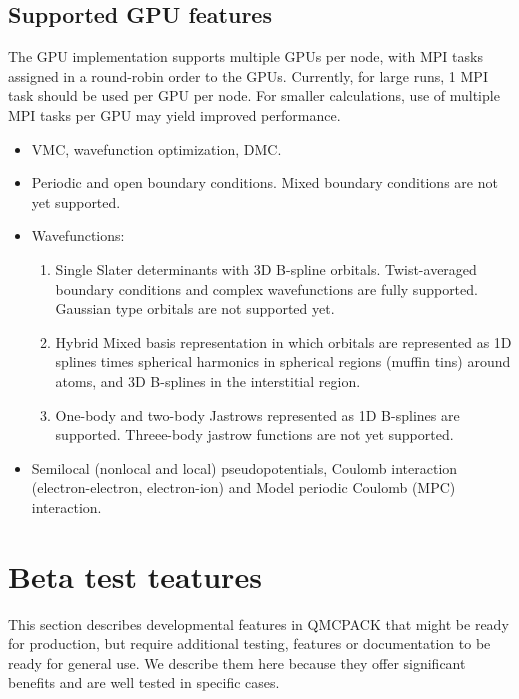 \subsection{Supported GPU features}

The GPU implementation supports multiple GPUs per node, with MPI tasks assigned
in a round-robin order to the GPUs. Currently, for large runs, 1 MPI task should
be used per GPU per node. For smaller calculations, use of multiple
MPI tasks per GPU may yield improved performance.

\begin{itemize}
  \item VMC, wavefunction optimization, DMC.
  \item Periodic and open boundary conditions. Mixed boundary conditions are not yet supported.
  \item Wavefunctions:
    \begin{enumerate}
        \item Single Slater determinants with 3D B-spline orbitals. Twist-averaged boundary conditions and complex wavefunctions are fully supported. Gaussian type orbitals are not supported yet.
        \item Hybrid Mixed basis representation in which orbitals are represented as 1D splines times spherical harmonics in spherical regions (muffin tins) around atoms, and 3D B-splines in the interstitial region.
        \item One-body and two-body Jastrows represented as 1D
          B-splines are supported. Threee-body jastrow functions are
          not yet supported.
    \end{enumerate}
  \item Semilocal (nonlocal and local) pseudopotentials, Coulomb interaction (electron-electron, electron-ion) and Model periodic Coulomb (MPC) interaction.
\end{itemize}

\section{Beta test teatures}

This section describes developmental features in QMCPACK that might be
ready for production, but require additional testing, features or
documentation to be ready for general use. We describe them here
because they offer significant benefits and are well tested in
specific cases.


